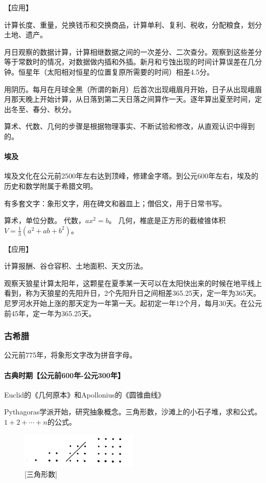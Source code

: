 【应用】

计算长度、重量，兑换钱币和交换商品，计算单利、复利、税收，分配粮食，划分土地、遗产。

月日观察的数据计算，计算相继数据之间的一次差分、二次查分。观察到这些差分等于常数时的情况，对数据做内插和外插。新月和亏蚀出现的时间计算误差在几分钟。恒星年（太阳相对恒星的位置复原所需要的时间）相差4.5分。

用阴历。每月在月球全黑（所谓的新月）后首次出现峨眉月开始，日子从出现峨眉月那天晚上开始计算，从日落到第二天日落之间算作一天。逐年算出夏至时间，定出冬至、春分、秋分。

算术、代数、几何的步骤是根据物理事实、不断试验和修改，从直观认识中得到的。


\paragraph{埃及}

埃及文化在公元前2500年左右达到顶峰，修建金字塔。到公元600年左右，埃及的历史和数学附属于希腊文明。

有多套文字：象形文字，用在碑文和器皿上；僧侣文，用于日常书写。

算术，单位分数。
代数，$ax^2 = b$。
几何，椎底是正方形的截棱锥体积$V = \frac{1}{3}(a^2+ab + b^2)$。


【应用】

计算报酬、谷仓容积、土地面积、天文历法。

观察天狼星计算太阳年，这颗星在夏季某一天可以在太阳快出来的时候在地平线上看到，称为天狼星的先阳升日，2个先阳升日之间相差365.25天，定一年为365天。尼罗河水开始上涨的那天定为一年第一天。起初定一年12个月，每月30天。在公元前45年，定一年为365.25天。



\subsubsection{古希腊}

公元前775年，将象形文字改为拼音字母。


\paragraph{古典时期【公元前600年-公元300年】}
Euclid的《几何原本》和Apollonius的《圆锥曲线》

Pythagoras学派开始，研究抽象概念。三角形数，沙滩上的小石子堆，求和公式。$1 + 2 + \cdots + n$的公式。

\begin{figure}[h]
    \centering
    \includegraphics[width=0.5\textwidth]{./resources/古今数学思想-图3_2.png}
    \caption{[三角形数]}
    \label{fig:1}
\end{figure}

